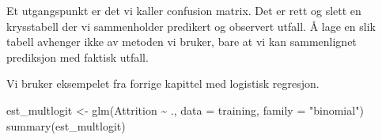 \documentclass[
  letterpaper,
  DIV=11,
  numbers=noendperiod]{scrreprt}
\newenvironment{Shaded}{\begin{snugshade}}{\end{snugshade}}
\newcommand{\AttributeTok}[1]{\textcolor[rgb]{0.40,0.45,0.13}{#1}}
\newcommand{\FunctionTok}[1]{\textcolor[rgb]{0.28,0.35,0.67}{#1}}
\newcommand{\NormalTok}[1]{\textcolor[rgb]{0.00,0.23,0.31}{#1}}
\newcommand{\OtherTok}[1]{\textcolor[rgb]{0.00,0.23,0.31}{#1}}
\newcommand{\SpecialCharTok}[1]{\textcolor[rgb]{0.37,0.37,0.37}{#1}}
\newcommand{\StringTok}[1]{\textcolor[rgb]{0.13,0.47,0.30}{#1}}
\begin{document}
Et utgangspunkt er det vi kaller confusion matrix. Det er rett og slett
en krysstabell der vi sammenholder predikert og observert utfall. Å lage
en slik tabell avhenger ikke av metoden vi bruker, bare at vi kan
sammenlignet prediksjon med faktisk utfall.

Vi bruker eksempelet fra forrige kapittel med logistisk regresjon.

\begin{Shaded}
\begin{Highlighting}[]
\NormalTok{est\_multlogit }\OtherTok{\textless{}{-}} \FunctionTok{glm}\NormalTok{(Attrition }\SpecialCharTok{\textasciitilde{}}\NormalTok{ ., }\AttributeTok{data =}\NormalTok{ training, }\AttributeTok{family =} \StringTok{"binomial"}\NormalTok{)}
\FunctionTok{summary}\NormalTok{(est\_multlogit)}
\end{Highlighting}
\end{Shaded}
\end{document}
